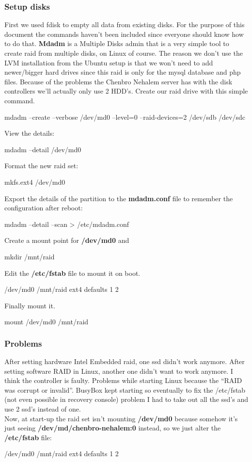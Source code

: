 \subsubsection{Setup disks}
First we used fdisk to empty all data from existing disks. For the purpose of this document the commands haven't been included since everyone should know how to do that.
\textbf{Mdadm}\label{mdadm}\cite{mdadmLink} is a Multiple Disks admin that is a very simple tool to create \gls{raid} from multiple disks, on Linux of course. 
The reason we don't use the LVM installation from the Ubuntu setup is that we won't need to add newer/bigger hard drives since this \gls{raid} is only for the \gls{mysql} database and \gls{php} files. 
Because of the problems the Chenbro Nehalem server has with the disk controllers we'll actually only use 2 HDD's.
Create our \gls{raid}\cite{mdadmLink2} drive with this simple command.
\begin{codelisting}
	mdadm --create --verbose /dev/md0 --level=0  --raid-devices=2 /dev/sdb /dev/sdc 
\end{codelisting}
View the details:
\begin{codelisting}
mdadm --detail /dev/md0
\end{codelisting}
Format the new \gls{raid} set:
\begin{codelisting}
mkfs.ext4 /dev/md0
\end{codelisting}
Export the details of the partition to the \textbf{mdadm.conf} file to remember the configuration after reboot:
\begin{codelisting}
mdadm --detail --scan > /etc/mdadm.conf
\end{codelisting}
Create a mount point for \textbf{/dev/md0} and 
\begin{codelisting}
mkdir /mnt/raid
\end{codelisting}
Edit the \textbf{/etc/fstab} file to mount it on boot.
\begin{codelisting}
/dev/md0      /mnt/raid     ext4    defaults    1 2
\end{codelisting}
Finally mount it.
\begin{codelisting}
mount /dev/md0 /mnt/raid
\end{codelisting}

\subsubsection{Problems}
After setting hardware Intel Embedded \gls{raid}, one \gls{ssd} didn't work anymore. After setting software RAID in Linux, another one didn't want to work anymore. I think the controller is faulty. Problems while starting Linux because the ``RAID was corrupt or invalid''. BusyBox kept starting so eventually to fix the /etc/fstab (not even possible in recovery console) problem I had to take out all the \gls{ssd}'s and use 2 \gls{ssd}'s instead of one.
\\Now, at start-up the \gls{raid} set isn't mounting \textbf{/dev/md0} because somehow it's just seeing \textbf{/dev/md/chenbro-nehalem:0} instead, so we just alter the \textbf{/etc/fstab} file:
\begin{codelisting}
	/dev/md0      /mnt/raid     ext4    defaults    1 2
\end{codelisting}

